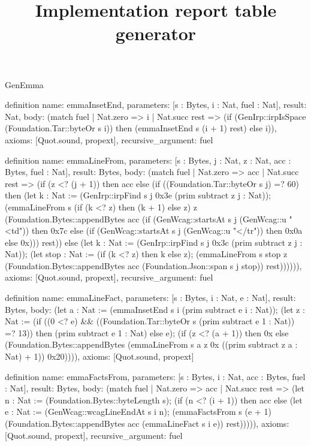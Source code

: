 \begin{lexlean}{GenEmma}
\title{Implementation report table generator}
\begin{semanticmodule}
definition{
  name: emmaInsetEnd,
  parameters: [s : Bytes, i : Nat, fuel : Nat],
  result: Nat,
  body: (match fuel
    | Nat.zero => i
    | Nat.succ rest => (if (GenIrp::irpIsSpace (Foundation.Tar::byteOr s i)) then (emmaInsetEnd s (i + 1) rest) else i)),
  axioms: [Quot.sound, propext],
  recursive_argument: fuel
}

definition{
  name: emmaLineFrom,
  parameters: [s : Bytes, j : Nat, z : Nat, acc : Bytes, fuel : Nat],
  result: Bytes,
  body: (match fuel
    | Nat.zero => acc
    | Nat.succ rest => (if (z <? (j + 1)) then acc else (if ((Foundation.Tar::byteOr s j) =? 60) then (let k : Nat := (GenIrp::irpFind s j 0x3e (prim subtract z j : Nat)); (emmaLineFrom s (if (k <? z) then (k + 1) else z) z (Foundation.Bytes::appendBytes acc (if (GenWcag::startsAt s j (GenWcag::u "<td")) then 0x7c else (if (GenWcag::startsAt s j (GenWcag::u "</tr")) then 0x0a else 0x))) rest)) else (let k : Nat := (GenIrp::irpFind s j 0x3c (prim subtract z j : Nat)); (let stop : Nat := (if (k <? z) then k else z); (emmaLineFrom s stop z (Foundation.Bytes::appendBytes acc (Foundation.Json::span s j stop)) rest)))))),
  axioms: [Quot.sound, propext],
  recursive_argument: fuel
}

definition{
  name: emmaLineFact,
  parameters: [s : Bytes, i : Nat, e : Nat],
  result: Bytes,
  body: (let a : Nat := (emmaInsetEnd s i (prim subtract e i : Nat)); (let z : Nat := (if ((0 <? e) && ((Foundation.Tar::byteOr s (prim subtract e 1 : Nat)) =? 13)) then (prim subtract e 1 : Nat) else e); (if (z <? (a + 1)) then 0x else (Foundation.Bytes::appendBytes (emmaLineFrom s a z 0x ((prim subtract z a : Nat) + 1)) 0x20)))),
  axioms: [Quot.sound, propext]
}

definition{
  name: emmaFactsFrom,
  parameters: [s : Bytes, i : Nat, acc : Bytes, fuel : Nat],
  result: Bytes,
  body: (match fuel
    | Nat.zero => acc
    | Nat.succ rest => (let n : Nat := (Foundation.Bytes::byteLength s); (if (n <? (i + 1)) then acc else (let e : Nat := (GenWcag::wcagLineEndAt s i n); (emmaFactsFrom s (e + 1) (Foundation.Bytes::appendBytes acc (emmaLineFact s i e)) rest))))),
  axioms: [Quot.sound, propext],
  recursive_argument: fuel
}


\end{semanticmodule}
\end{lexlean}

